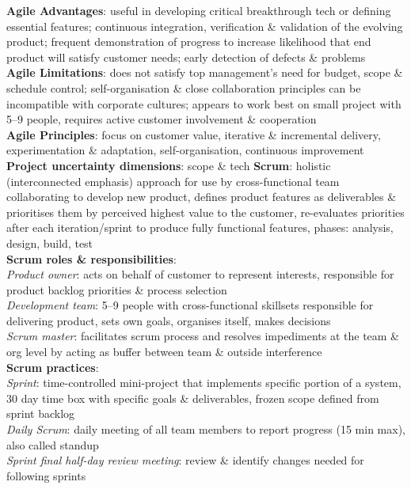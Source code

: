 \documentclass[a4paper]{article}
\begin{document}
\begin{multicols}{3}
        \textbf{Agile Advantages}: useful in developing critical breakthrough tech or defining essential features; continuous integration, verification \& validation of the evolving product; frequent demonstration of progress to increase likelihood that end product will satisfy customer needs; early detection of defects \& problems\\
        \textbf{Agile Limitations}: does not satisfy top management's need for budget, scope \& schedule control; self-organisation \& close collaboration principles can be incompatible with corporate cultures; appears to work best on small project with 5--9 people, requires active customer involvement \& cooperation\\
        \textbf{Agile Principles}: focus on customer value, iterative \& incremental delivery, experimentation \& adaptation, self-organisation, continuous improvement\\
        \textbf{Project uncertainty dimensions}: scope \& tech
        \textbf{Scrum}: holistic (interconnected emphasis) approach for use by cross-functional team collaborating to develop new product, defines product features as deliverables \& prioritises them by perceived highest value to the customer, re-evaluates priorities after each iteration/sprint to produce fully functional features, phases: analysis, design, build, test\\
        \textbf{Scrum roles \& responsibilities}:\\
        \textit{Product owner}: acts on behalf of customer to represent interests, responsible for product backlog priorities \& process selection\\
        \textit{Development team}: 5--9 people with cross-functional skillsets responsible for delivering product, sets own goals, organises itself, makes decisions\\
        \textit{Scrum master}: facilitates scrum process and resolves impediments at the team \& org level by acting as buffer between team \& outside interference\\
        \textbf{Scrum practices}:\\
        \textit{Sprint}: time-controlled mini-project that implements specific portion of a system, 30 day time box with specific goals \& deliverables, frozen scope defined from sprint backlog\\
        \textit{Daily Scrum}: daily meeting of all team members to report progress (15 min max), also called standup\\
        \textit{Sprint final half-day review meeting}: review \& identify changes needed for following sprints\\

\end{multicols}
\end{document}
